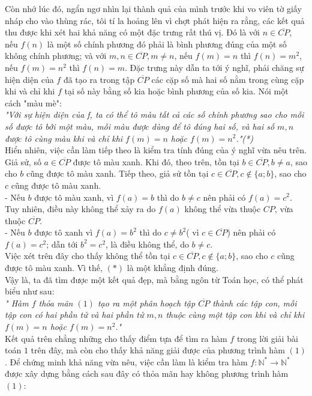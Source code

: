 Còn nhớ lúc đó, ngẩn ngơ nhìn lại thành quả của mình trước khi vo viên tờ giấy nháp cho vào thùng rác, tôi tí la hoảng lên vì chợt phát hiện ra rằng, các kết quả thu được khi xét hai khả năng có một đặc trưng rất thú vị. Đó là với $n\in\overline{CP}$, nếu $f(n)$ là một số chính phương đó phải là bình phương đúng của một số không chính phương; và với $m,n\in\overline{CP}, m\not=n$, nếu $f(m)=n$ thì $f(n)=m^2$, nếu $f(m)=n^2$ thì $f(n)=m$. Đặc trưng này dẫn ta tới ý nghĩ, phải chăng sự hiện diện của $f$ đã tạo ra trong tập $\overline{CP}$ các cặp số mà hai số nằm trong cùng cặp khi và chỉ khi $f$ tại số này bằng số kia hoặc bình phương của số kia. Nói một cách "màu mè": \\
\textit{"Với sự hiện diện của f, ta có thể tô màu tất cả các số chính phương sao cho mỗi số được tô bởi một màu, mỗi màu được dùng để tô đúng hai số, và hai số $m,n$ được tô cùng màu khi và chỉ khi $f(m)=n$ hoặc $f(m)=n^2$."(*)}\\
Hiển nhiên, việc cần làm tiếp theo là kiểm tra tính đúng của ý nghĩ vừa nêu trên.\\
Giả sử, số $a\in\overline{CP}$ được tô màu xanh. Khi đó, theo trên, tồn tại $b\in\overline{CP}, b\not=a$, sao cho $b$ cũng được tô màu xanh. Tiếp theo, giả sử tồn tại $c\in\overline{CP}, c\not\in\{a;b\}$, sao cho $c$ cũng được tô màu xanh.\\
- Nếu $b$ được tô màu xanh, vì $f(a)=b$ thì do $b\not= c$ nên phải có $f(a)=c^2$. Tuy nhiên, điều này không thể xảy ra do $f(a)$ không thể vừa thuộc $CP$, vừa thuộc $\overline{CP}$.\\
- Nếu $b$ được tô xanh vì $f(a)=b^2$ thì do $c\not= b^2$( vì $c\in\overline{CP}$) nên phải có $f(a)=c^2$; dẫn tới $b^2=c^2$, là điều không thể, do $b\not= c$.\\
Việc xét trên đây cho thấy không thể tồn tại $c\in\overline{CP}, c\not\in\{a;b\}$, sao cho $c$ cũng được tô màu xanh. Vì thế, $(*)$ là một khẳng định đúng.\\
Vậy là, ta đã tìm được một kết quả đẹp, mà bằng ngôn từ Toán học, có thể phát biểu như sau:\\
\textit{" Hàm $f$ thỏa mãn $(1)$ tạo ra một phân hoạch tập $\overline{CP}$ thành các tập con, mỗi tập con có hai phần tử và hai phần tử $m,n$ thuộc cùng một tập con khi và chỉ khi $f(m)=n$ hoặc $f(m)=n^2$."}\\
Kết quả trên chẳng những cho thấy điểm tựa để tìm ra hàm $f$ trong lời giải bài toán $1$ trên đây, mà còn cho thấy khả năng giải được của phương trình hàm $(1)$. Để chứng minh khả năng vừa nêu, việc cần làm là kiểm tra hàm $f:\mathbb{N}^*\longrightarrow \mathbb{N}^*$ được xây dựng bằng cách sau đây có thỏa mãn hay không phương trình hàm $(1)$:\\
